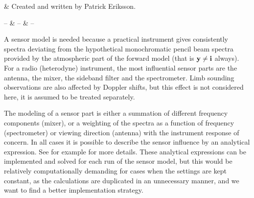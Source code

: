 %
%
 \label{sec:sensor}


%
%
 & Created and written by Patrick Eriksson.\\
\stophistory


%
%
%
\startsymbols
  -- & -- & -- \\
 \label{symtable:sensor}     
\stopsymbols



%
%
A sensor model is needed because a practical instrument gives consistently
spectra deviating from the hypothetical monochromatic pencil
beam spectra provided by the atmospheric part of the forward model
(that is $\mathbf{y}\neq\mathbf{i}$ always). For a radio (heterodyne) instrument, the
most influential sensor parts are the antenna, the mixer, the sideband
filter and the spectrometer. Limb sounding observations are also
affected by Doppler shifts, but this effect is not considered here, it
is assumed to be treated separately.




 \label{sec:sensor:strategy}
 
 The modeling of a sensor part is either a summation of different
 frequency components (mixer), or a weighting of the spectra as a
 function of frequency (spectrometer) or viewing direction (antenna)
 with the instrument response of concern. In all cases it is
 possible to describe the sensor influence by an analytical
 expression. See for example \citet{eriksson:97a} for more details.
 These analytical expressions can be implemented and solved for each
 run of the sensor model, but this would be relatively computationally
 demanding for cases when the settings are kept constant, as the
 calculations are duplicated in an unnecessary manner, and we want to
 find a better implementation strategy.
 
